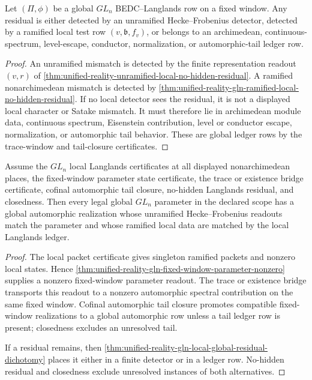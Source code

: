 \begin{theorem}
\label{thm:unified-reality-gln-local-global-residual-dichotomy}
Let $(\Pi,\phi)$ be a global $GL_n$ BEDC--Langlands row on a fixed
window. Any residual is either detected by an unramified
Hecke--Frobenius detector, detected by a ramified local test row
$(v,\mathfrak b,f_v)$, or belongs to an archimedean, continuous-spectrum,
level-escape, conductor, normalization, or automorphic-tail ledger row.
\end{theorem}
\begin{proof}
An unramified mismatch is detected by the finite representation readout
$(v,r)$ of
\autoref{thm:unified-reality-unramified-local-no-hidden-residual}. A
ramified nonarchimedean mismatch is detected by
\autoref{thm:unified-reality-gln-ramified-local-no-hidden-residual}.
If no local detector sees the residual, it is not a displayed local
character or Satake mismatch. It must therefore lie in archimedean
module data, continuous spectrum, Eisenstein contribution, level or
conductor escape, normalization, or automorphic tail behavior. These are
global ledger rows by the trace-window and tail-closure certificates.
\end{proof}

\begin{theorem}
\label{thm:unified-reality-gln-bedc-langlands-conditional-closure}
Assume the $GL_n$ local Langlands certificates at all displayed
nonarchimedean places, the fixed-window parameter state certificate,
the trace or existence bridge certificate, cofinal automorphic tail
closure, no-hidden Langlands residual, and closedness. Then every legal
global $GL_n$ parameter in the declared scope has a global automorphic
realization whose unramified Hecke--Frobenius readouts match the
parameter and whose ramified local data are matched by the local
Langlands ledger.
\end{theorem}
\begin{proof}
The local packet certificate gives singleton ramified packets and
nonzero local states. Hence
\autoref{thm:unified-reality-gln-fixed-window-parameter-nonzero}
supplies a nonzero fixed-window parameter readout. The trace or
existence bridge transports this readout to a nonzero automorphic
spectral contribution on the same fixed window. Cofinal automorphic tail
closure promotes compatible fixed-window realizations to a global
automorphic row unless a tail ledger row is present; closedness excludes
an unresolved tail.

If a residual remains, then
\autoref{thm:unified-reality-gln-local-global-residual-dichotomy} places
it either in a finite detector or in a ledger row. No-hidden residual
and closedness exclude unresolved instances of both alternatives.
\end{proof}

